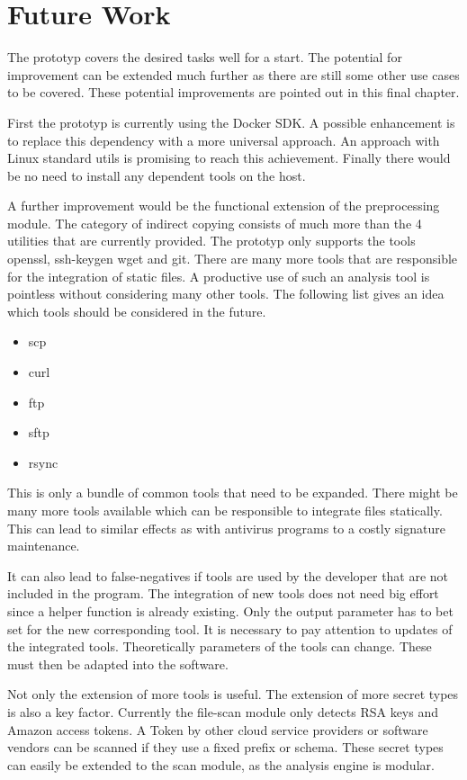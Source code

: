 \chapter{Future Work}
\label{ch:end:future}
The prototyp covers the desired tasks well for a start.
The potential for improvement can be extended much further as there are still some other use cases to be covered.
These potential improvements are pointed out in this final chapter.

First the prototyp is currently using the Docker SDK. 
A possible enhancement is to replace this dependency with a more universal approach. 
An approach with Linux standard utils is promising to reach this achievement.
Finally there would be no need to install any dependent tools on the host.

A further improvement would be the functional extension of the preprocessing module.
The category of indirect copying consists of much more than the 4 utilities that are currently provided.
The prototyp only supports the tools openssl, ssh-keygen wget and git.
There are many more tools that are responsible for the integration of static files. 
A productive use of such an analysis tool is pointless without considering many other tools.
The following list gives an idea which tools should be considered in the future.
\begin{itemize}
\item scp
\item curl
\item ftp
\item sftp
\item rsync
\end{itemize}
This is only a bundle of common tools that need to be expanded.
There might be many more tools available which can be responsible to integrate files statically.
This can lead to similar effects as with antivirus programs to a costly signature maintenance.

It can also lead to false-negatives if tools are used by the developer that are not included in the program.
The integration of new tools does not need big effort since a helper function is already existing.
Only the output parameter has to bet set for the new corresponding tool.
It is necessary to pay attention to updates of the integrated tools.
Theoretically parameters of the tools can change. 
These must then be adapted into the software.

Not only the extension of more tools is useful. The extension of more secret types is also a key factor.
Currently the file-scan module only detects RSA keys and Amazon access tokens.
A Token by other cloud service providers or software vendors can be scanned if they use a fixed prefix or schema.
These secret types can easily be extended to the scan module, as the analysis engine is modular.

